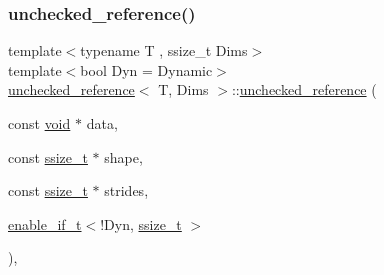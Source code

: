 \subsubsection{\texorpdfstring{unchecked\_reference()}{unchecked\_reference()}\hspace{0.1cm}{\footnotesize\ttfamily [1/2]}}
{\footnotesize\ttfamily template$<$typename T , ssize\+\_\+t Dims$>$ \\
template$<$bool Dyn = Dynamic$>$ \\
\mbox{\hyperlink{classunchecked__reference}{unchecked\+\_\+reference}}$<$ T, Dims $>$\+::\mbox{\hyperlink{classunchecked__reference}{unchecked\+\_\+reference}} (\begin{DoxyParamCaption}\item[{const \mbox{\hyperlink{_s_d_l__opengles2__gl2ext_8h_ae5d8fa23ad07c48bb609509eae494c95}{void}} $\ast$}]{data,  }\item[{const \mbox{\hyperlink{detail_2common_8h_ac430d16fc097b3bf0a7469cfd09decda}{ssize\+\_\+t}} $\ast$}]{shape,  }\item[{const \mbox{\hyperlink{detail_2common_8h_ac430d16fc097b3bf0a7469cfd09decda}{ssize\+\_\+t}} $\ast$}]{strides,  }\item[{\mbox{\hyperlink{detail_2common_8h_a012819c9e8b5e04872a271f50f8b8196}{enable\+\_\+if\+\_\+t}}$<$!Dyn, \mbox{\hyperlink{detail_2common_8h_ac430d16fc097b3bf0a7469cfd09decda}{ssize\+\_\+t}} $>$}]{ }\end{DoxyParamCaption})\hspace{0.3cm}{\ttfamily [inline]}, {\ttfamily [protected]}}

\mbox{\label{classunchecked__reference_a6872fd3f36835f14b6e943aebdbc0ae4}} 
